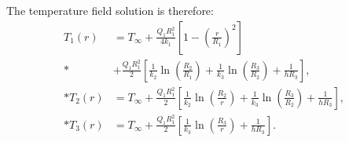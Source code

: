The temperature field solution is therefore:
\begin{subequations}
\begin{align}
  T_1(r) &= T_\infty + \frac{Q_1 R_1^2}{4k_1} \left[ 1 - \left( \frac{r}{R_1} \right)^2 \right] \nonumber \\*
         &+ \frac{Q_1 R_1^2}{2} \left[ \frac{1}{k_2} \ln \left( \frac{R_2}{R_1} \right) 
          + \frac{1}{k_3} \ln \left( \frac{R_3}{R_2} \right)  + \frac{1}{h R_3} \right] , \\*
  T_2(r) &= T_\infty + \frac{Q_1 R_1^2}{2} \left[ \frac{1}{k_2} \ln \left( \frac{R_2}{r} \right) + \frac{1}{k_3} \ln \left( \frac{R_3}{R_2} \right) + \frac{1}{h R_3} \right] , \\*
  T_3(r) &= T_\infty + \frac{Q_1 R_1^2}{2} \left[ \frac{1}{k_3}  \ln \left( \frac{R_3}{r} \right) + \frac{1}{h R_3} \right] .
\end{align}
\end{subequations}

